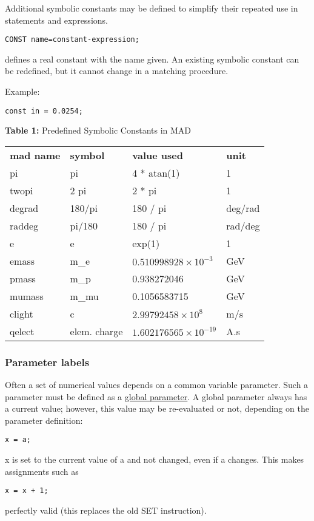 Additional symbolic constants may be defined to simplify their repeated
use in statements and expressions.  

\begin{verbatim}
CONST name=constant-expression;
\end{verbatim} 
defines a real constant with the name given. An existing symbolic
constant can be redefined, but it cannot change in a matching procedure.  

Example: 
\begin{verbatim}
const in = 0.0254;
\end{verbatim}

\begin{table}
\begin{center}
{\textbf{Table 1:} Predefined Symbolic Constants in MAD}
\begin{tabular}{l|l|l|l}
\textbf{mad name} & \textbf{symbol} & \textbf{value used} & \textbf{unit} \\ 
pi & pi & 4 * atan(1) & 1 \\ 
twopi & 2 pi & 2 * pi & 1 \\ 
degrad & 180/pi & 180 / pi & deg/rad \\ 
raddeg & pi/180 & 180 / pi & rad/deg \\ 
e & e & exp(1) & 1 \\ 
emass & m\_e & $0.510998928\times 10^{-3}$& GeV \\ %
pmass & m\_p & 0.938272046 & GeV \\ %
mumass & m\_mu & 0.1056583715 & GeV \\ %
clight & c & $2.99792458\times 10^{8}$ & m/s \\ 
qelect & elem. charge & $1.602176565\times 10^{-19}$ & A.s %
\end{tabular}
\end{center}
\end{table}

\subsubsection{Parameter labels} 
Often a set of numerical values depends on a common variable
parameter. Such a parameter must be defined as a
\href{parameter.html}{global parameter}. A global parameter always has a
current value; however, this value may be re-evaluated or not, depending
on the parameter definition:  
\begin{verbatim}
x = a;
\end{verbatim} 
x is set to the current value of a and not changed, even if a
changes. This makes assignments such as  
\begin{verbatim}
x = x + 1;
\end{verbatim} 
perfectly valid (this replaces the old SET instruction). 

